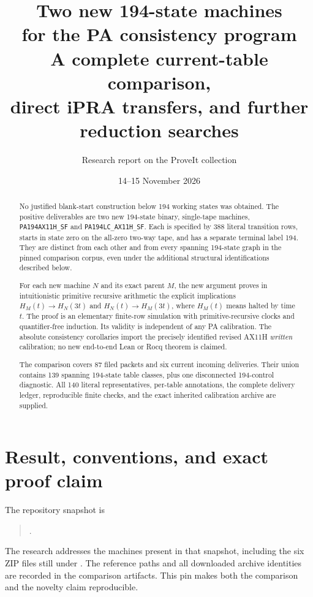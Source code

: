 \documentclass[11pt,letterpaper]{article}
\title{\vspace{-1.2em}\textbf{Two new 194-state machines\protect\\for the PA consistency program}\protect\\[0.5em]\large A complete current-table comparison,\protect\\ direct iPRA transfers, and further reduction searches}
\author{Research report on the ProveIt collection}
\date{14--15 November 2026}
\newcommand{\file}[1]{\path{#1}}
\begin{document}
\maketitle
\vspace{-1.2em}

\begin{abstract}
No justified blank-start construction below 194 working states was obtained.
The positive deliverables are two new 194-state binary, single-tape machines,
\texttt{PA194AX11H\_SF} and \texttt{PA194LC\_AX11H\_SF}. Each is specified by
388 literal transition rows, starts in state zero on the all-zero two-way
tape, and has a separate terminal label 194. They are distinct from each
other and from every spanning 194-state graph in the pinned comparison
corpus, even under the additional structural identifications described below.

For each new machine $N$ and its exact parent $M$, the new argument proves
in intuitionistic primitive recursive arithmetic the explicit implications
$H_M(t)\to H_N(3t)$ and $H_N(t)\to H_M(3t)$, where $H_M(t)$ means halted
by time $t$. The proof is an elementary finite-row simulation with
primitive-recursive clocks and quantifier-free induction. Its validity is
independent of any PA calibration. The absolute consistency corollaries
import the precisely identified revised AX11H \emph{written} calibration;
no new end-to-end Lean or Rocq theorem is claimed.

The comparison covers 87 filed packets and six current incoming deliveries.
Their union contains 139 spanning 194-state table classes, plus one
disconnected 194-control diagnostic. All 140 literal representatives,
per-table annotations, the complete delivery ledger, reproducible finite
checks, and the exact inherited calibration archive are supplied.
\end{abstract}

\section{Result, conventions, and exact proof claim}

The repository snapshot is
\begin{quote}\small
{}.
\end{quote}
The research addresses the machines present in that snapshot, including
the six ZIP files still under \file{docs/incoming}. The reference paths and
all downloaded archive identities are recorded in the comparison artifacts.\cite{repo,incoming}
This pin makes both the comparison and the novelty claim reproducible.
\end{document}
